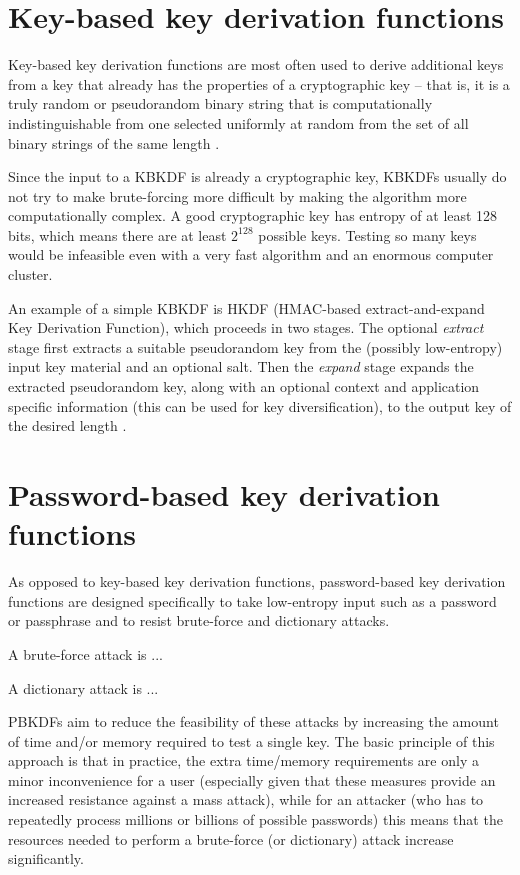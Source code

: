 \documentclass[12pt,oneside]{fithesis2}
\begin{document}
      \section{Key-based key derivation functions}
      Key-based key derivation functions are most often used to derive additional keys from a key that already has the properties of a cryptographic key -- that is, it is a truly random or pseudorandom binary string that is computationally indistinguishable from one selected uniformly at random from the set of all binary strings of the same length \cite{nist:sp800:108}.
      
      Since the input to a KBKDF is already a cryptographic key, KBKDFs usually do not try to make brute-forcing more difficult by making the algorithm more computationally complex. A good cryptographic key has entropy of at least 128 bits, which means there are at least $2^{128}$ possible keys. Testing so many keys would be infeasible even with a very fast algorithm and an enormous computer cluster.
      
      An example of a simple KBKDF is HKDF (HMAC-based extract-and-expand Key Derivation Function), which proceeds in two stages. The optional \emph{extract} stage first extracts a suitable pseudorandom key from the (possibly low-entropy) input key material and an optional salt. Then the \emph{expand} stage expands the extracted pseudorandom key, along with an optional context and application specific information (this can be used for key diversification), to the output key of the desired length \cite{hkdf, rfc5869}.
      
      \section{Password-based key derivation functions}
      As opposed to key-based key derivation functions, password-based key derivation functions are designed specifically to take low-entropy input such as a password or passphrase and to resist brute-force and dictionary attacks.
      
      A brute-force attack is ...
      
      A dictionary attack is ...
      
      PBKDFs aim to reduce the feasibility of these attacks by increasing the amount of time and/or memory required to test a single key. The basic principle of this approach is that in practice, the extra time/memory requirements are only a minor inconvenience for a user (especially given that these measures provide an increased resistance against a mass attack), while for an attacker (who has to repeatedly process millions or billions of possible passwords) this means that the resources needed to perform a brute-force (or dictionary) attack increase significantly.
      
\end{document}
